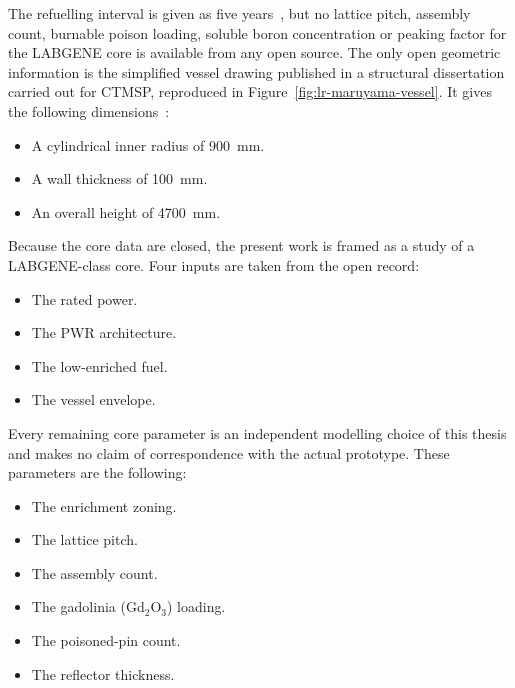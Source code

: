 The refuelling interval is given as five years~\cite{dinizcosta_2017},
but no lattice pitch, assembly count, burnable poison loading, soluble
boron concentration or peaking factor for the LABGENE core is available
from any open source. The only open geometric information is the simplified
vessel drawing published in a structural dissertation carried out for
CTMSP, reproduced in Figure~\ref{fig:lr-maruyama-vessel}. It gives the
following dimensions~\cite{maruyama_2013}:

\begin{itemize}
  \item A cylindrical inner radius of 900~mm.

  \item A wall thickness of 100~mm.

  \item An overall height of 4700~mm.
\end{itemize}

Because the core data are closed, the present work is framed as a study
of a LABGENE-class core. Four inputs are taken from the open record:

\begin{itemize}
  \item The rated power.

  \item The PWR architecture.

  \item The low-enriched fuel.

  \item The vessel envelope.
\end{itemize}

Every remaining core parameter is an independent modelling choice of
this thesis and makes no claim of correspondence with the actual
prototype. These parameters are the following:

\begin{itemize}
  \item The enrichment zoning.

  \item The lattice pitch.

  \item The assembly count.

  \item The gadolinia (Gd$_2$O$_3$) loading.

  \item The poisoned-pin count.

  \item The reflector thickness.
\end{itemize}

